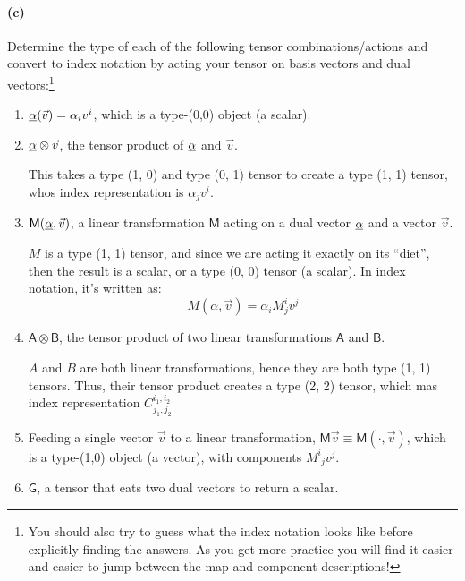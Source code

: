 \documentclass{article}
\begin{document}
\paragraph{(c)}
Determine the type of each of the following tensor combinations/actions and convert to index notation by acting your tensor on basis vectors and dual vectors:\footnote{You should
also try to guess what the index notation looks like before explicitly finding the answers.  As you get more practice you will find it easier and easier to jump between the map
and component descriptions!}
	\begin{enumerate}
		\item {}  $\underline{\alpha}(\vec{v}) = \alpha_{i}v^{i}$, which is a type-(0,0) object (a scalar).
		\item $\underline{\alpha}\otimes\vec{v}$, the {tensor product} of $\underline{\alpha}$ and $\vec{v}$.

			\begin{solution}
				This takes a type (1, 0) and type (0, 1) tensor to create a type (1, 1) tensor, whos index
				representation is $ \alpha_j v^i$.
			\end{solution}
		\item $\mathsf{M}(\underline{\alpha},\vec{v})$, a linear transformation $\mathsf{M}$ acting on a dual vector $\underline{\alpha}$ and a vector $\vec{v}$.

			\begin{solution}
				$M$ is a type (1, 1) tensor, and since we are acting it exactly on its ``diet'', then the result
				is a scalar, or a type (0, 0) tensor (a scalar). In index notation, it's written as:
				\[
				M(\underline \alpha, \vec v) = \alpha_i M^i_j v^j
				\] 
			\end{solution}
		\item $\mathsf{A}\otimes\mathsf{B}$, the tensor product of two linear transformations $\mathsf{A}$ and $\mathsf{B}$.

			\begin{solution}
				$A$ and $B$ are both linear transformations, hence they are both type (1, 1) tensors. Thus, 
				their tensor product creates a type (2, 2) tensor, which mas index representation $C^{i_1, i_2}_{j_1, j_2}$
			\end{solution}
		\item {}  Feeding a single vector $\vec{v}$ to a linear transformation, $\mathsf{M}\vec{v} \equiv \mathsf{M}(\cdot,\vec{v})$, which is
			a type-(1,0) object (a vector), with components $M^{i}_{\phantom{i}j}v^{j}$.
		\item $\mathsf{G}$, a tensor that eats two dual vectors to return a scalar.


\end{enumerate}
\end{document}
